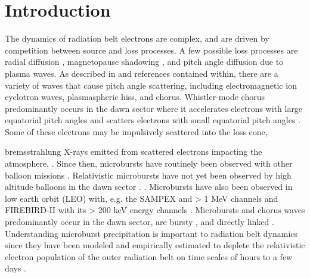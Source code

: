 \documentclass[draft, linenumbers]{agujournal}
\begin{document}
\section{Introduction}\label{Intro}
The dynamics of radiation belt electrons are complex, and are driven by competition between source and loss processes. A few possible loss processes are radial diffusion \citep{Shprits2004}, magnetopause shadowing \citep{Ukhorskiy2006}, and pitch angle  diffusion \citep[e.g.][]{Abel1998_1, Summers1998, Meredith2002, Selesnick2003, Horne2003, Thorne2005} due to  plasma waves.  As described in \citep{Millan2007, Thorne2010} and references contained within, there are a variety of waves that cause pitch angle scattering, including electromagnetic ion cyclotron waves, plasmaspheric hiss, and  chorus. Whistler-mode chorus predominantly occurs in the dawn sector \citep{Li2009} where it accelerates electrons with large equatorial pitch angles and scatters electrons with small equatorial pitch angles \citep{Horne2003}. Some of these electrons may be impulsively scattered into the loss cone, 

 \citet{Anderson1964}   bremsstrahlung X-rays emitted from scattered electrons impacting the atmosphere, . Since then, microbursts have routinely been observed with other balloon missions \citep{Parks1967, Woodger2015, Anderson2017}. Relativistic microbursts have not yet been observed by high altitude balloons in the dawn sector \citep{Millan2002, Millan2007}.  \citep{Lee2012}. Microbursts have also been observed in low earth orbit (LEO) with, e.g. the SAMPEX  and > 1 MeV channels \citep{Nakamura1995, Nakamura2000, Blake1996, Lorentzen2001a, Lorentzen2001b, O'Brien2003, O'Brien2004, Blum2015} and FIREBIRD-II with its > 200 keV energy channels \citep{Crew2016, Breneman2017}. Microbursts and chorus waves predominantly occur in the dawn sector, are bursty \citep{Lorentzen2001b}, and  directly linked  \citet{Breneman2017}.  Understanding microburst precipitation is important to radiation belt dynamics since they have been modeled and empirically estimated to deplete the relativistic electron population of the outer radiation belt on time scales of hours to a few days \citep{O'Brien2004, Thorne2005, Shprits2007, Breneman2017}. 
\end{document}
